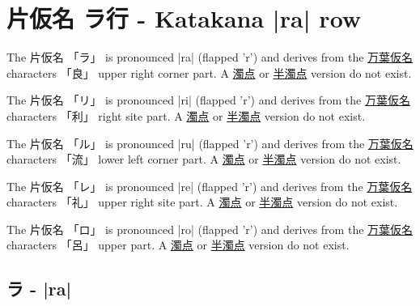 \section{片仮名  ラ行 - Katakana |ra| row}


 The  片仮名 {「ラ」} is pronounced  |ra| (flapped 'r')  and  derives from the
\hyperref[sec:Manyogana]{万葉仮名} characters {「良」} upper right corner part.
A \hyperref[sec:Dakuten]{濁点}  or \hyperref[sec:Handakuten]{半濁点} version  do not exist.


 The  片仮名 {「リ」} is pronounced  |ri| (flapped 'r')  and  derives from the
\hyperref[sec:Manyogana]{万葉仮名} characters {「利」}  right site part.
A \hyperref[sec:Dakuten]{濁点}  or \hyperref[sec:Handakuten]{半濁点} version  do not exist.


\newpage

 The  片仮名 {「ル」} is pronounced  |ru| (flapped 'r')  and  derives from the
\hyperref[sec:Manyogana]{万葉仮名} characters {「流」} lower left corner part.
A \hyperref[sec:Dakuten]{濁点}  or \hyperref[sec:Handakuten]{半濁点} version  do not exist.


 The  片仮名 {「レ」} is pronounced  |re| (flapped 'r')  and  derives from the
\hyperref[sec:Manyogana]{万葉仮名} characters {「礼」} upper right site part.
A \hyperref[sec:Dakuten]{濁点}  or \hyperref[sec:Handakuten]{半濁点} version  do not exist.

 The  片仮名 {「ロ」} is pronounced  |ro| (flapped 'r')  and  derives from the
\hyperref[sec:Manyogana]{万葉仮名} characters {「呂」} upper part.
A \hyperref[sec:Dakuten]{濁点}  or \hyperref[sec:Handakuten]{半濁点} version  do not exist.


\newpage

\subsection{ラ - |ra|} \label{sec:KatakanaRa}

